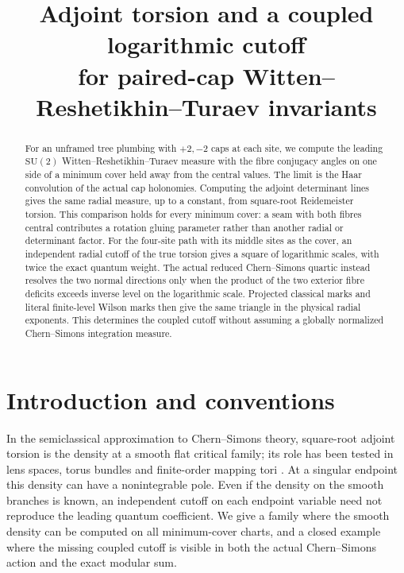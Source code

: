 \documentclass[11pt]{article}
\title{Adjoint torsion and a coupled logarithmic cutoff\\for paired-cap Witten--Reshetikhin--Turaev invariants}
\author{}
\date{}
\newcommand{\SU}{\mathrm{SU}(2)}
\begin{document}
\maketitle
\begin{abstract}
For an unframed tree plumbing with \(+2,-2\) caps at each site, we compute the leading \(\SU\) Witten--Reshetikhin--Turaev measure with the fibre conjugacy angles on one side of a minimum cover held away from the central values. The limit is the Haar convolution of the actual cap holonomies. Computing the adjoint determinant lines gives the same radial measure, up to a constant, from square-root Reidemeister torsion. This comparison holds for every minimum cover: a seam with both fibres central contributes a rotation gluing parameter rather than another radial or determinant factor. For the four-site path with its middle sites as the cover, an independent radial cutoff of the true torsion gives a square of logarithmic scales, with twice the exact quantum weight. The actual reduced Chern--Simons quartic instead resolves the two normal directions only when the product of the two exterior fibre deficits exceeds inverse level on the logarithmic scale. Projected classical marks and literal finite-level Wilson marks then give the same triangle in the physical radial exponents. This determines the coupled cutoff without assuming a globally normalized Chern--Simons integration measure.
\end{abstract}

\section{Introduction and conventions}
In the semiclassical approximation to Chern--Simons theory, square-root adjoint torsion is the density at a smooth flat critical family; its role has been tested in lens spaces, torus bundles and finite-order mapping tori \cite{Jeffrey,AH,Charles}. At a singular endpoint this density can have a nonintegrable pole. Even if the density on the smooth branches is known, an independent cutoff on each endpoint variable need not reproduce the leading quantum coefficient. We give a family where the smooth density can be computed on all minimum-cover charts, and a closed example where the missing coupled cutoff is visible in both the actual Chern--Simons action and the exact modular sum.
\end{document}
